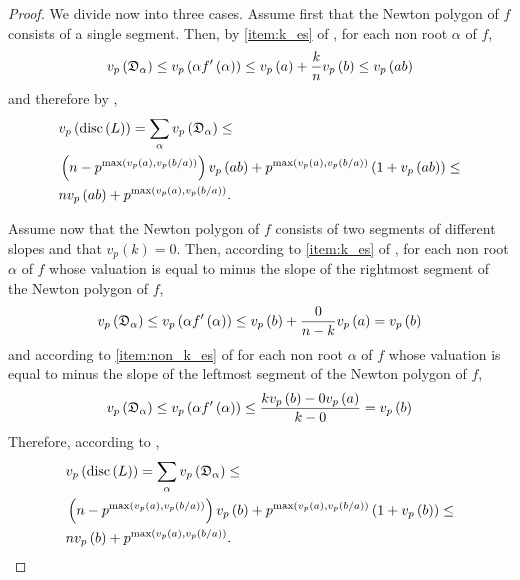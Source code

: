 \documentclass[../main.tex]{subfiles}
\begin{document}
  \begin{proof}
    We divide now into three cases.
    Assume first that the Newton polygon of $f$ consists of a single segment.
    Then, by \cref{item:k_es} of , for each non \ex root $\alpha$ of $f$,
    \[
      v_p\left( \mathfrak{D}_\alpha \right) 
      \leq
      v_p\left( \alpha f'\left( \alpha \right) \right)
      \leq
      v_p\left( a \right) + \frac{k}{n} v_p\left( b \right)
      \leq
      v_p\left( ab \right)
    \]
    and therefore by ,    
    \begin{align*}
      &
      v_p\left( \operatorname{disc}\left( L \right) \right)
      =
      \sum_{\alpha} v_p\left( \mathfrak{D}_\alpha \right)
      \leq 
      \\
      &
      \left( n - p^{\max\left( v_p\left( a \right), v_p\left( b / a \right) \right)} \right) v_p\left( ab \right)
      +
      p^{\max\left( v_p\left( a \right), v_p\left( b / a \right) \right)} \left( 1 + v_p\left( ab \right) \right)
      \leq
      \\
      &
      nv_p\left( ab \right) + p^{\max\left( v_p\left( a \right), v_p\left( b / a \right) \right)}
      .
    \end{align*}

    Assume now that the Newton polygon of $f$ consists of two segments of different slopes and that $v_p\left( k \right) = 0$.
    Then, according to \cref{item:k_es} of , for each non \ex root $\alpha$ of $f$ whose valuation is equal to minus the slope of the rightmost segment of the Newton polygon of $f$,
    \[
      v_p\left( \mathfrak{D}_\alpha \right) 
      \leq
      v_p\left( \alpha f'\left( \alpha \right) \right)
      \leq
      v_p\left( b \right) + \frac{0}{n - k}v_p\left( a \right)
      =
      v_p\left( b \right)
    \]
    and according to \cref{item:non_k_es} of  for each non \ex root $\alpha$ of $f$ whose valuation is equal to minus the slope of the leftmost segment of the Newton polygon of $f$,
    \[
      v_p\left( \mathfrak{D}_\alpha \right) 
      \leq
      v_p\left( \alpha f'\left( \alpha \right) \right)
      \leq
      \frac{k v_p\left( b \right) - 0 v_p\left( a \right)}{k - 0}
      =
      v_p\left( b \right)
    \]
    Therefore, according to ,    
    \begin{align*}
      &
      v_p\left( \operatorname{disc}\left( L \right) \right)
      = 
      \sum_{\alpha} v_p\left( \mathfrak{D}_\alpha \right)
      \leq
      \\
      &
      \left( n - p^{\max\left( v_p\left( a \right), v_p\left( b / a \right) \right)} \right) v_p\left( b \right)
      +
      p^{\max\left( v_p\left( a \right), v_p\left( b / a \right) \right)} \left( 1 + v_p\left( b \right) \right)
      \leq
      \\
      &
      nv_p\left( b \right) + p^{\max\left( v_p\left( a \right), v_p\left( b / a \right) \right)}
      .
    \end{align*}



\end{proof}
\end{document}

